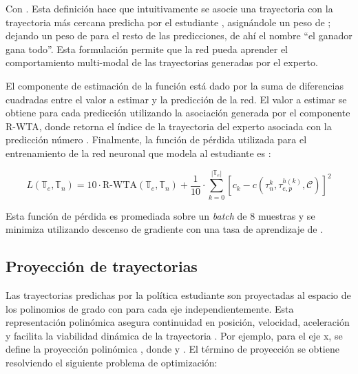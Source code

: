 Con . Esta definición hace que intuitivamente se asocie una trayectoria  con la trayectoria más cercana predicha por el estudiante , asignándole un peso de ; dejando un peso de  para el resto de las predicciones, de ahí el nombre ``el ganador gana todo''. Esta formulación permite que la red pueda aprender el comportamiento multi-modal de las trayectorias generadas por el experto.

El componente de estimación de la función  está dado por la suma de diferencias cuadradas entre el valor a estimar y la predicción de la red. El valor a estimar se obtiene para cada predicción utilizando la asociación generada por el componente R-WTA, donde  retorna el índice de la trayectoria del experto asociada con la predicción número . Finalmente, la función de pérdida utilizada para el entrenamiento de la red neuronal que modela al estudiante es \cite{Loquercio2021}:

\begin{equation}
\label{eq:aoa-student-spacial-loss-full}
    L(\mathbb{T}_e, \mathbb{T}_n) = 10 \cdot \text{R-WTA}(\mathbb{T}_e, \mathbb{T}_n) + \frac{1}{10} \cdot \sum_{k=0}^{|\mathbb{T}_e|} [c_k - c(\tau_{n}^{k}, \tau_{e,p}^{h(k)}, \mathcal{C})]^2
\end{equation}

Esta función de pérdida es promediada sobre un \textit{batch} de 8 muestras y se minimiza utilizando descenso de gradiente \cite{Loquercio2021} con una tasa de aprendizaje de .

\subsection{Proyección de trayectorias} 

\label{sec:prev-aoa-traj}

Las trayectorias predichas por la política estudiante son proyectadas al espacio de los polinomios de grado  con  para cada eje independientemente. Esta representación polinómica asegura continuidad en posición, velocidad, aceleración y facilita la viabilidad dinámica de la trayectoria \cite{mellinger2011minimum}. Por ejemplo, para el eje x, se define la proyección polinómica , donde  y . El término de proyección  se obtiene resolviendo el siguiente problema de optimización:

